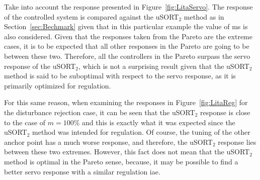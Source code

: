 Take into account the response presented in Figure~\ref{fig:LitaServo}. The response of the controlled system is compared against the uSORT$_2$ method as in Section~\ref{sec:Bechmark} given that in this particular example the value of \gls{ms} is also considered. Given that the responses taken from the Pareto are the extreme cases, it is to be expected that all other responses in the Pareto are going to be between these two. Therefore, all the controllers in the Pareto surpass the servo response of the uSORT$_2$, which is not a surprising result given that the uSORT$_2$ method is said to be suboptimal with respect to the servo response, as it is primarily optimized for regulation.

For this same reason, when examining the responses in Figure~\ref{fig:LitaReg} for the disturbance rejection case, it can be seen that the uSORT$_2$ response is close to the case of $m = 100\%$ and this is exactly what it was expected since the uSORT$_2$ method was intended for regulation. Of course, the tuning of the other anchor point has a much worse response, and therefore, the uSORT$_2$ response lies between these two extremes. However, this fact does not mean that the uSORT$_2$ method is optimal in the Pareto sense, because, it may  be possible to find a better servo response with a similar regulation \gls{iae}.

